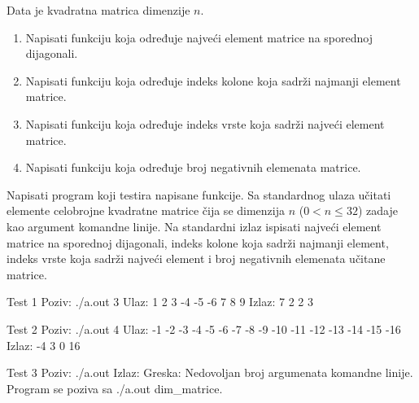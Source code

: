 \begin{Exercise}[label=323]
Data je kvadratna matrica dimenzije $n$.
\begin{enumerate}
\item Napisati funkciju koja određuje najveći element matrice na sporednoj dijagonali.
\item Napisati funkciju koja određuje indeks kolone koja sadrži najmanji element matrice.
\item Napisati funkciju koja određuje indeks vrste koja sadrži najveći element matrice.
\item Napisati funkciju koja određuje broj negativnih elemenata matrice.
\end{enumerate}
Napisati program koji testira napisane funkcije. Sa standardnog
ulaza učitati elemente celobrojne kvadratne matrice čija
se dimenzija $n$ ($0 < n \leq 32$) zadaje kao argument
komandne linije. Na standardni izlaz ispisati najveći element matrice na sporednoj dijagonali,
indeks kolone koja sadrži najmanji element, indeks vrste koja sadrži najveći element i broj 
negativnih elemenata učitane matrice. 

\begin{miditest}
\begin{test}{Test 1}
Poziv:  ./a.out 3
Ulaz:   1 2 3
        -4 -5 -6
        7 8 9
Izlaz:  7 2 2 3
\end{test}
\end{miditest}
\begin{miditest}
\begin{test}{Test 2}
Poziv:  ./a.out 4
Ulaz:   -1 -2 -3 -4
        -5 -6 -7 -8
        -9 -10 -11 -12
        -13 -14 -15 -16
Izlaz:  -4 3 0 16
\end{test}
\end{miditest}

\begin{maxitest}
\begin{test}{Test 3}
Poziv: ./a.out 
Izlaz: Greska: Nedovoljan broj argumenata komandne linije.
       Program se poziva sa ./a.out dim_matrice.
\end{test}
\end{maxitest}
\end{Exercise}
\begin{Answer}[ref=323]
\end{Answer}


